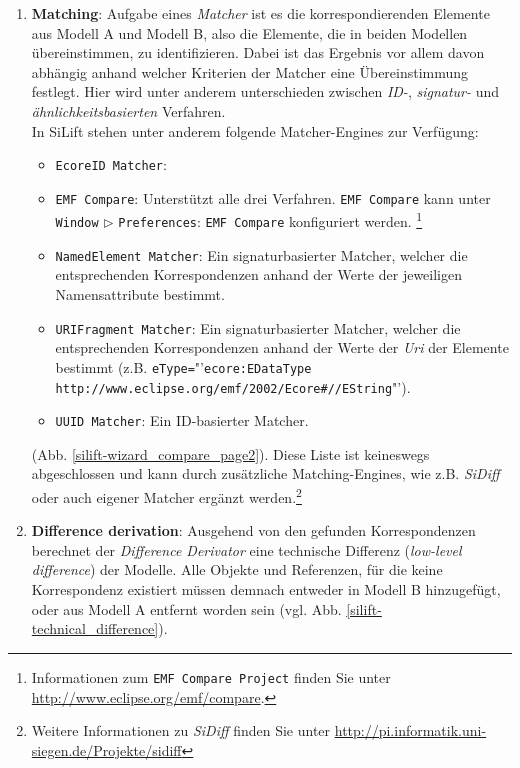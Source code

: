 \documentclass[a4paper]{scrartcl}
\begin{document}
\begin{enumerate}
\item \textbf{Matching}: Aufgabe eines \textit{Matcher} ist es die korrespondierenden Elemente aus Modell A und Modell B, also die Elemente, die in beiden Modellen übereinstimmen, zu identifizieren.
Dabei ist das Ergebnis vor allem davon abhängig anhand welcher Kriterien der Matcher eine Übereinstimmung festlegt.
Hier wird unter anderem unterschieden zwischen \textit{ID-}, \textit{signatur-} und \textit{ähnlichkeitsbasierten} Verfahren.\\
In SiLift stehen unter anderem folgende Matcher-Engines zur Verfügung:

\begin{itemize}
	\item \texttt{EcoreID Matcher}:
	\item \texttt{EMF Compare}: Unterstützt alle drei Verfahren. \texttt{EMF Compare} kann unter \texttt{Win\-dow} $\triangleright$ \texttt{Preferences}: \texttt{EMF Compare} konfiguriert werden. \footnote{Informationen zum \texttt{EMF Compare Project} finden Sie unter \url{http://www.eclipse.org/emf/compare}.}
	
	\item \texttt{NamedElement Matcher}: Ein signaturbasierter Matcher, welcher die ent\-sprech\-enden Korrespondenzen anhand der Werte der jeweiligen Namensattribute bestimmt.
	
	\item \texttt{URIFragment Matcher}: Ein signaturbasierter Matcher, welcher die ent\-sprech\-enden Korrespondenzen anhand der Werte der \textit{Uri} der Elemente bestimmt (z.B. \texttt{eType=}"'\texttt{ecore:EDataType http://www.eclipse.org/emf/2002/\-E\-core\-\#//EString}"').
	
	\item \texttt{UUID Matcher}: Ein ID-basierter Matcher.
\end{itemize}
(Abb. \ref{silift-wizard_compare_page2}).
Diese Liste ist keineswegs abgeschlossen und kann durch zusätzliche Matching-Engines, wie z.B. \textit{SiDiff} oder auch eigener Matcher ergänzt werden.\footnote{Weitere Informationen zu \textit{SiDiff} finden Sie unter \url{http://pi.informatik.uni-siegen.de/Projekte/sidiff}}\\

\item \textbf{Difference derivation}: Ausgehend von den gefunden Korrespondenzen berechnet der \textit{Difference Derivator} eine technische Differenz (\textit{low-level difference}) der Mo\-del\-le.
Alle Objekte und Referenzen, für die keine Korrespondenz existiert müssen demnach entweder in Modell B hinzugefügt, oder aus Modell A entfernt worden sein (vgl. Abb. \ref{silift-technical_difference}).


\end{enumerate}
\end{document}
